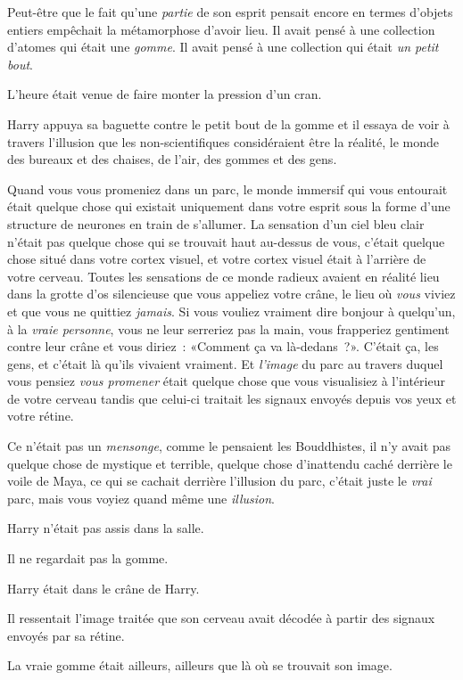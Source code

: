 Peut-être que le fait qu'une \emph{partie} de son esprit pensait encore en termes d'objets entiers empêchait la métamorphose d'avoir lieu. Il avait pensé à une collection d'atomes qui était une \emph{gomme}. Il avait pensé à une collection qui était \emph{un petit bout}.

L'heure était venue de faire monter la pression d'un cran.

Harry appuya sa baguette contre le petit bout de la gomme et il essaya de voir à travers l'illusion que les non-scientifiques considéraient être la réalité, le monde des bureaux et des chaises, de l'air, des gommes et des gens.

Quand vous vous promeniez dans un parc, le monde immersif qui vous entourait était quelque chose qui existait uniquement dans votre esprit sous la forme d'une structure de neurones en train de s'allumer. La sensation d'un ciel bleu clair n'était pas quelque chose qui se trouvait haut au-dessus de vous, c'était quelque chose situé dans votre cortex visuel, et votre cortex visuel était à l'arrière de votre cerveau. Toutes les sensations de ce monde radieux avaient en réalité lieu dans la grotte d'os silencieuse que vous appeliez votre crâne, le lieu où \emph{vous} viviez et que vous ne quittiez \emph{jamais}. Si vous vouliez vraiment dire bonjour à quelqu'un, à la \emph{vraie personne}, vous ne leur serreriez pas la main, vous frapperiez gentiment contre leur crâne et vous diriez~: «Comment ça va là-dedans~?». C'était ça, les gens, et c'était là qu'ils vivaient vraiment. Et \emph{l'image} du parc au travers duquel vous pensiez \emph{vous promener} était quelque chose que vous visualisiez à l'intérieur de votre cerveau tandis que celui-ci traitait les signaux envoyés depuis vos yeux et votre rétine.

Ce n'était pas un \emph{mensonge}, comme le pensaient les Bouddhistes, il n'y avait pas quelque chose de mystique et terrible, quelque chose d'inattendu caché derrière le voile de Maya, ce qui se cachait derrière l'illusion du parc, c'était juste le \emph{vrai} parc, mais vous voyiez quand même une \emph{illusion}.

Harry n'était pas assis dans la salle.

Il ne regardait pas la gomme.

Harry était dans le crâne de Harry.

Il ressentait l'image traitée que son cerveau avait décodée à partir des signaux envoyés par sa rétine.

La vraie gomme était ailleurs, ailleurs que là où se trouvait son image.

